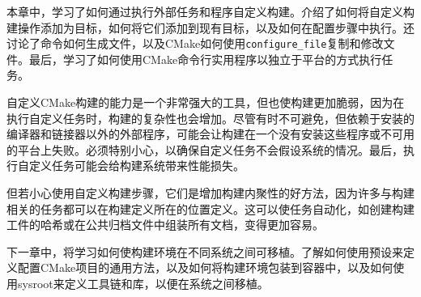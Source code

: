 本章中，学习了如何通过执行外部任务和程序自定义构建。介绍了如何将自定义构建操作添加为目标，如何将它们添加到现有目标，以及如何在配置步骤中执行。还讨论了命令如何生成文件，以及CMake如何使用\texttt{configure\_file}复制和修改文件。最后，学习了如何使用CMake命令行实用程序以独立于平台的方式执行任务。

自定义CMake构建的能力是一个非常强大的工具，但也使构建更加脆弱，因为在执行自定义任务时，构建的复杂性也会增加。尽管有时不可避免，但依赖于安装的编译器和链接器以外的外部程序，可能会让构建在一个没有安装这些程序或不可用的平台上失败。必须特别小心，以确保自定义任务不会假设系统的情况。最后，执行自定义任务可能会给构建系统带来性能损失。

但若小心使用自定义构建步骤，它们是增加构建内聚性的好方法，因为许多与构建相关的任务都可以在构建定义所在的位置定义。这可以使任务自动化，如创建构建工件的哈希或在公共归档文件中组装所有文档，变得更加容易。

下一章中，将学习如何使构建环境在不同系统之间可移植。了解如何使用预设来定义配置CMake项目的通用方法，以及如何将构建环境包装到容器中，以及如何使用sysroot来定义工具链和库，以便在系统之间移植。